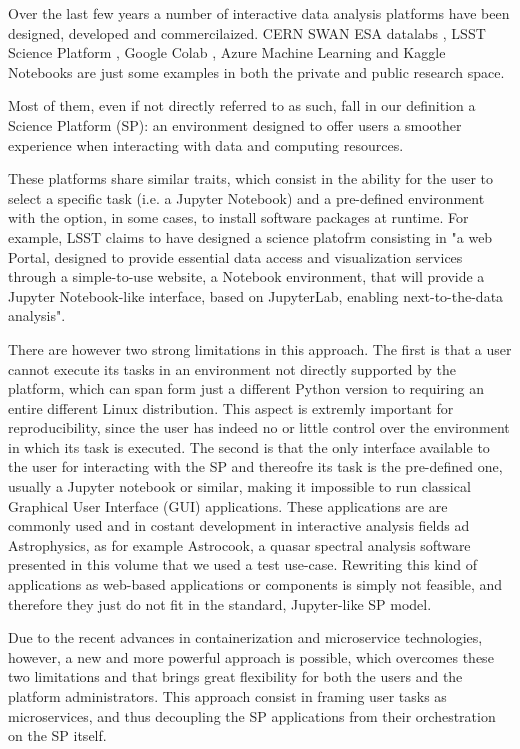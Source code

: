 \documentclass[11pt,twoside]{article}
\begin{document}
Over the last few years a number of interactive data analysis platforms have been designed, developed and commercilaized. 
CERN SWAN \citep{piparo2018swan}
ESA datalabs \citep{esa_datalabs},
LSST Science Platform \citep{juric2017lsst},
Google Colab \citep{bisong2019google},
Azure Machine Learning \citep{azureml}
and Kaggle Notebooks \citep{kagglenotebooks}
are just some examples in both the private and public research space.

Most of them, even if not directly referred to as such, fall in our definition a Science Platform (SP): an environment designed to offer users a smoother experience when interacting with data and computing resources. 

These platforms share similar traits, which consist in the ability for the user to select a specific task (i.e. a Jupyter Notebook) and a pre-defined environment with the option, in some cases, to install software packages at runtime. For example, LSST claims to have designed a science platofrm consisting in "a web Portal, designed to provide essential data access and visualization services through a simple-to-use website, a Notebook environment, that will provide a Jupyter Notebook-like interface, based on JupyterLab, enabling next-to-the-data analysis".

There are however two strong limitations in this approach. The first is that a user cannot execute its tasks in an environment not directly supported by the platform, which can span form just a different Python version to requiring an entire different Linux distribution. This aspect is extremly important for reproducibility, since the user has indeed no or little control over the environment in which its task is executed. The second is that the only interface available to the user for interacting with the SP and thereofre its task is the pre-defined one, usually a Jupyter notebook or similar, making it impossible to run classical Graphical User Interface (GUI) applications. These applications are are commonly used and in costant development in interactive analysis fields ad Astrophysics, as for example Astrocook, a quasar spectral analysis software presented in this volume \citep{cupani} that we used a test use-case. Rewriting this kind of applications as web-based applications or components is simply not feasible, and therefore they just do not fit in the standard, Jupyter-like SP model.
 
Due to the recent advances in containerization and microservice technologies, however, a new and more powerful approach is possible, which overcomes these two limitations and that brings great flexibility for both the users and the platform administrators. This approach consist in framing user tasks as microservices, and thus decoupling the SP applications from their orchestration on the SP itself.
\end{document}
